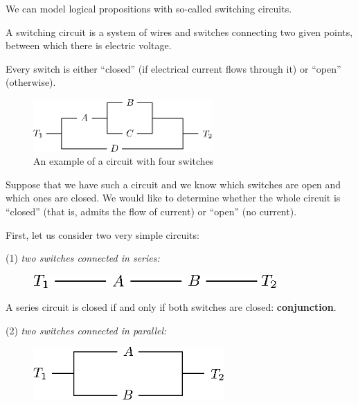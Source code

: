 \documentclass[11pt,paper=b5,footinclude,headinclude]{scrbook} %
\theoremstyle{remark}
\theoremstyle{definition} %
\theoremstyle{theorem} %
\begin{document}
We can model logical propositions with so-called switching circuits.

A switching circuit is a system of wires and switches connecting two given points,
between which there is electric voltage.

Every switch is either ``closed'' (if electrical current flows through it) or ``open'' (otherwise).

\begin{figure}[h!]
\begin{center}
\includegraphics[height=20mm]{vezje.eps}
\caption{An example of a circuit with four switches}\label{fig:vezje}
\end{center}
\end{figure}

Suppose that we have such a circuit and we know which switches are open and which ones are closed.
We would like to determine whether the whole circuit is ``closed'' (that is, admits the flow of current)
or ``open'' (no current).

\medskip
First, let us consider two very simple circuits:

(1) {\em two switches connected in series:}
\begin{figure}[h!]
\begin{center}
\includegraphics[height=5mm]{vezje-zaporedno.eps}\label{fig:vezje-zap}
\end{center}
\end{figure}

A series circuit is closed if and only if both switches are closed: \textbf{ conjunction}.

(2) {\em two switches connected in parallel:}

\begin{figure}[h!]
\begin{center}
\includegraphics[height=20mm]{vezje-vzporedno.eps}\label{fig:vezje-vzp}
\end{center}
\end{figure}
\end{document}
